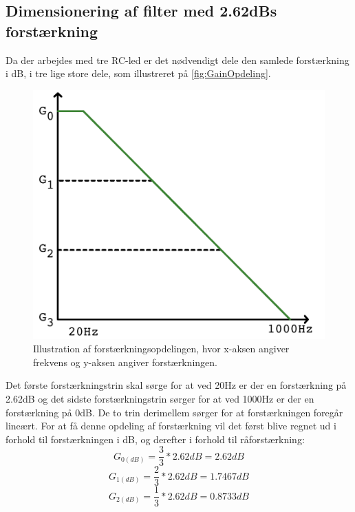 \subsection{Dimensionering af filter med 2.62dBs forstærkning}
\label{DimensioneringAfFilter2.62}
%
Da der arbejdes med tre RC-led er det nødvendigt dele den samlede forstærkning i dB, i tre lige store dele, som illustreret på \autoref{fig:GainOpdeling}.
%
\begin{figure}[H]
	\centering
	\includegraphics[resolution=300,scale=\circuitSize]{Figure/DesignAfFilter/GainOpdeling.pdf}
	\caption{Illustration af forstærkningsopdelingen, hvor x-aksen angiver frekvens og y-aksen angiver forstærkningen.}
	\label{fig:GainOpdeling}
\end{figure}
\noindent
%
Det første forstærkningstrin skal sørge for at ved 20Hz er der en forstærkning på 2.62dB og det sidste forstærkningstrin sørger for at ved 1000Hz er der en forstærkning på 0dB. De to trin derimellem sørger for at forstærkningen foregår lineært. For at få denne opdeling af forstærkning vil det først blive regnet ud i forhold til forstærkningen i dB, og derefter i forhold til råforstærkning: 
%
\begin{equation}
	G_{0(dB)} = \frac{3}{3}*2.62dB = 2.62dB
\end{equation} 
%
\begin{equation}
	G_{1(dB)} = \frac{2}{3}*2.62dB = 1.7467dB
\end{equation}
%
\begin{equation}
	G_{2(dB)} = \frac{1}{3}*2.62dB = 0.8733dB
\end{equation}
